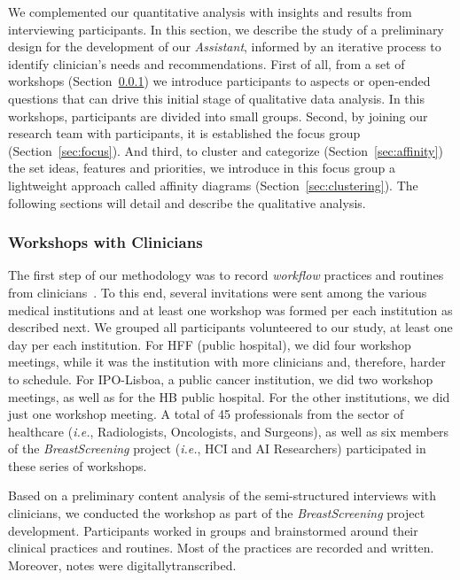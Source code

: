 We complemented our quantitative analysis with insights and results from interviewing participants.
In this section, we describe the study of a preliminary design for the development of our {\it Assistant}, informed by an iterative process to identify clinician's needs and recommendations.
First of all, from a set of workshops (Section~\ref{sec:workshops}) we introduce participants to aspects or open-ended questions that can drive this initial stage of qualitative data analysis.
In this workshops, participants are divided into small groups.
Second, by joining our research team with participants, it is established the focus group (Section~\ref{sec:focus}).
And third, to cluster and categorize (Section~\ref{sec:affinity}) the set ideas, features and priorities, we introduce in this focus group a lightweight approach called affinity diagrams (Section~\ref{sec:clustering}).
The following sections will detail and describe the qualitative analysis.

\subsubsection{Workshops with Clinicians}
\label{sec:workshops}

The first step of our methodology was to record {\it workflow} practices and routines from clinicians~\cite{Hoiseth:2013:DHG:2485760.2485770, Hoiseth:2013:RGD:2468356.2468436}.
To this end, several invitations were sent among the various medical institutions and at least one workshop was formed per each institution as described next.
We grouped all participants volunteered to our study, at least one day per each institution.
For HFF (public hospital), we did four workshop meetings, while it was the institution with more clinicians and, therefore, harder to schedule.
For IPO-Lisboa, a public cancer institution, we did two workshop meetings, as well as for the HB public hospital.
For the other institutions, we did just one workshop meeting.
A total of 45 professionals from the sector of healthcare ({\it i.e.}, Radiologists, Oncologists, and Surgeons), as well as six members of the {\it BreastScreening} project ({\it i.e.}, HCI and AI Researchers) participated in these series of workshops.

Based on a preliminary content analysis of the semi-structured interviews with clinicians, we conducted the workshop as part of the {\it BreastScreening} project development.
Participants worked in groups and brainstormed around their clinical practices and routines.
Most of the practices are recorded and written.
Moreover, notes were digitally\footnotemark[15] transcribed.


